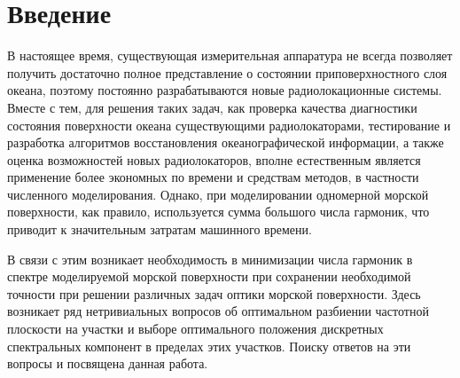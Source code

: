 
\usepackage{gensymb}
\usepackage{textcomp}
\usepackage{pythontex}
\usepackage[e]{esvect} %

\def\labauthors{Понур К.А.}
\def\labgroup{430}
\def\department{}
\def\labtheme{Численное моделирование морской поверхности}

\renewcommand{\Re}{\operatorname{Re}}
\renewcommand{\Im}{\operatorname{Im}}
\renewcommand{\phi}{\varphi}
\renewcommand{\hat}{\widehat}
\renewcommand{\vec}{\vv}

\tableofcontents
\newpage


\section{Введение}
В настоящее время, существующая измерительная аппаратура не всегда позволяет получить достаточно полное представление о состоянии приповерхностного  слоя океана, поэтому постоянно разрабатываются новые радиолокационные системы. 
Вместе с тем, для решения таких задач, как проверка качества диагностики состояния поверхности океана существующими радиолокаторами, тестирование и разработка алгоритмов восстановления океанографической информации, а также оценка возможностей новых радиолокаторов, вполне естественным является применение более экономных по времени и средствам методов, в частности численного моделирования.  Однако, при моделировании одномерной морской поверхности, как правило, используется сумма большого числа гармоник, что приводит к значительным затратам машинного времени.

В связи с этим возникает необходимость в минимизации числа гармоник в спектре моделируемой морской поверхности при сохранении необходимой точности при решении различных задач оптики морской поверхности. Здесь возникает ряд нетривиальных вопросов об оптимальном разбиении частотной плоскости на участки и выборе оптимального положения дискретных спектральных компонент в пределах этих участков. Поиску ответов на эти вопросы и посвящена данная работа.



